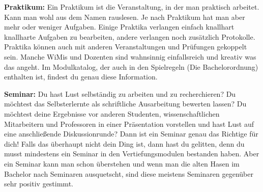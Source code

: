 \textbf{Praktikum: }
Ein Praktikum ist die Veranstaltung, in der man praktisch arbeitet. Kann man wohl aus dem Namen rauslesen. Je nach Praktikum hat man aber mehr oder weniger Aufgaben. Einige Praktika verlangen einfach knallhart knallharte Aufgaben zu bearbeiten, andere verlangen noch zusätzlich Protokolle. Praktika können auch mit anderen Veranstaltungen und Prüfungen gekoppelt sein. Manche WiMis und Dozenten sind wahnsinnig einfallsreich und kreativ was das angeht. Im Modulkatalog, der auch in den Spielregeln (Die Bachelorordnung) enthalten ist, findest du genau diese Information. 

\textbf{Seminar: }
Du hast Lust selbständig zu arbeiten und zu recherchieren? Du möchtest das Selbsterlernte als schriftliche Ausarbeitung bewerten lassen? Du möchtest deine Ergebnisse vor anderen Studenten, wissenschaftlichen Mitarbeitern und Professoren in einer Präsentation vorstellen und hast Lust auf eine anschließende Diskussionrunde? Dann ist ein Seminar genau das Richtige für dich! Falls das überhaupt nicht dein Ding ist, dann hast du gelitten, denn du musst mindestens ein Seminar in den Vertiefungsmodulen bestanden haben. Aber ein Seminar kann man schon überstehen und wenn man die alten Hasen im Bachelor nach Seminaren ausquetscht, sind diese meistens Seminaren gegenüber sehr positiv gestimmt.
\spaltenende
